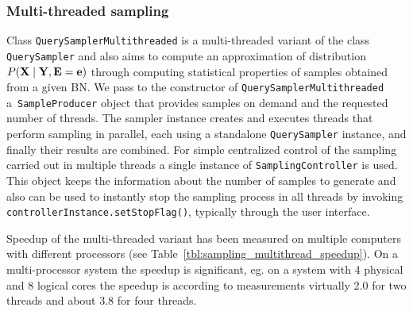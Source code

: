 \documentclass[english,cover]{fitthesis} %
\newcommand{\srccode}[1]{{\tt #1}}         %
\newcommand{\vars}[1]{{\bold{#1}}}         %
\begin{document}
\subsubsection{Multi-threaded sampling}
Class \srccode{QuerySamplerMultithreaded} is a multi-threaded variant of the class \srccode{QuerySampler} and also aims to compute an approximation of distribution $P(\vars{X} \mid \vars{Y}, \vars{E} = \vars{e})$ through computing statistical properties of samples obtained from a given BN. We pass to the constructor of \srccode{QuerySamplerMultithreaded} a~\srccode{SampleProducer} object that provides samples on demand and the requested number of threads. The sampler instance creates and executes threads that perform sampling in parallel, each using a standalone \srccode{QuerySampler} instance, and finally their results are combined. For simple centralized control of the sampling carried out in multiple threads a single instance of \srccode{SamplingController} is used. This object keeps the information about the number of samples to generate and also can be used to instantly stop the sampling process in all threads by invoking \srccode{controllerInstance.setStopFlag()}, typically through the user interface.

Speedup of the multi-threaded variant has been measured on multiple computers with different processors (see Table~\ref{tbl:sampling_multithread_speedup}). On a multi-processor system the speedup is significant, eg. on a system with 4 physical and 8 logical cores the speedup is according to measurements virtually 2.0 for two threads and about 3.8 for four threads.
\end{document}
